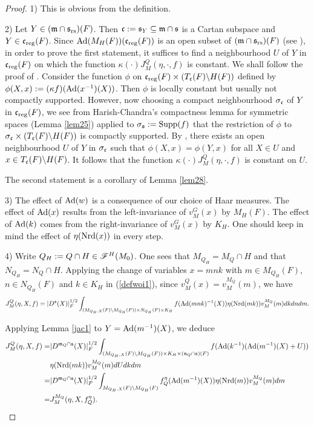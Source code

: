 \documentclass[a4paper]{amsart}
\newcommand{\fm}{{\mathfrak{m}}} \newcommand{\fn}{{\mathfrak{n}}}\newcommand{\fo}{{\mathfrak{o}}} \newcommand{\fp}{{\mathfrak{p}}}
\theoremstyle{definition}
\theoremstyle{remark}
\numberwithin{equation}{subsection}
\begin{document}
\begin{proof}
1) This is obvious from the definition. 

2) Let $Y\in(\fm\cap\fs_\rs)(F)$. Then $\fc:=\fs_Y\subseteq\fm\cap\fs$ is a Cartan subspace and $Y\in{\mathfrak{c}}_{\mathrm{reg}}(F)$. 
Since ${\mathrm{Ad}}(M_H(F))({\mathfrak{c}}_{\mathrm{reg}}(F))$ is an open subset of $(\fm\cap\fs_\rs)(F)$ (see \cite[p. 105]{MR1375304}), in order to prove the first statement, it suffices to find a neighbourhood $U$ of $Y$ in ${\mathfrak{c}}_{\mathrm{reg}}(F)$ on which the function $\kappa(\cdot)J_M^Q(\eta, \cdot, f)$ is constant. We shall follow the proof of \cite[Theorem 17.11]{MR2192014}. Consider the function $\phi$ on ${\mathfrak{c}}_{\mathrm{reg}}(F)\times(T_{\mathfrak{c}}(F)\backslash H(F))$ defined by $\phi(X,x):=(\kappa f)({\mathrm{Ad}}(x^{-1})(X))$. Then $\phi$ is locally constant but usually not compactly supported. However, now choosing a compact neighbourhood $\sigma_{\mathfrak{c}}$ of $Y$ in ${\mathfrak{c}}_{\mathrm{reg}}(F)$, we see from Harish-Chandra's compactness lemma for symmetric spaces (Lemma \ref{lem25}) applied to $\sigma_{\mathfrak{s}}:={\mathrm{Supp}}(f)$ that the restriction of $\phi$ to $\sigma_{\mathfrak{c}}\times(T_{\mathfrak{c}}(F)\backslash H(F))$ is compactly supported. By \cite[Lemma 2.1]{MR2192014}, there exists an open neighbourhood $U$ of $Y$ in $\sigma_{\mathfrak{c}}$ such that $\phi(X,x)=\phi(Y,x)$ for all $X\in U$ and $x\in T_{\mathfrak{c}}(F)\backslash H(F)$. It follows that the function $\kappa(\cdot)J_M^Q(\eta, \cdot, f)$ is constant on $U$. 

The second statement is a corollary of Lemma \ref{lem28}. 

3) The effect of ${\mathrm{Ad}}(w)$ is a consequence of our choice of Haar measures. The effect of ${\mathrm{Ad}}(x)$ results from the left-invariance of $v_M^G(x)$ by $M_H(F)$. The effect of ${\mathrm{Ad}}(k)$ comes from the right-invariance of $v_M^G(x)$ by $K_H$. One should keep in mind the effect of $\eta({\mathrm{Nrd}}(x))$ in every step. 

4) Write $Q_H:=Q\cap H\in\mathscr{F}^H(M_0)$. One sees that $M_{Q_H}=M_Q\cap H$ and that $N_{Q_H}=N_Q\cap H$. Applying the change of variables $x=mnk$ with $m\in M_{Q_H}(F)$, $n\in N_{Q_H}(F)$ and $k\in K_H$ in (\ref{defwoi1}), since $v_M^Q(x)=v_M^{M_Q}(m)$, we have
$$ J_M^Q(\eta, X, f)=|D^{\mathfrak{s}}(X)|_F^{1/2} \int_{(M_{Q_H,X}(F)\backslash M_{Q_H}(F))\times N_{Q_H}(F)\times K_H} f({\mathrm{Ad}}(mnk)^{-1}(X)) \eta({\mathrm{Nrd}}(mk)) v_M^{M_Q}(m) dk dn dm. $$

Applying Lemma \ref{jac1} to $Y={\mathrm{Ad}}(m^{-1})(X)$, we deduce
\[\begin{split} 
J_M^Q(\eta, X, f)=&|D^{\fm_Q\cap\fs}(X)|_F^{1/2} \int_{(M_{Q_H,X}(F)\bs M_{Q_H}(F))\times K_H\times (\fn_Q\cap\fs)(F)} f(\Ad(k^{-1})(\Ad(m^{-1})(X)+U)) \\ 
&\eta(\Nrd(mk)) v_M^{M_Q}(m) dU dk dm \\
=&|D^{\fm_Q\cap\fs}(X)|_F^{1/2} \int_{M_{Q_H,X}(F)\bs M_{Q_H}(F)} f_Q^\eta(\Ad(m^{-1})(X)) \eta(\Nrd(m)) v_M^{M_Q}(m) dm \\
=&J_M^{M_Q}(\eta, X, f_Q^\eta). 
\end{split}\]


\end{proof}
\end{document}

